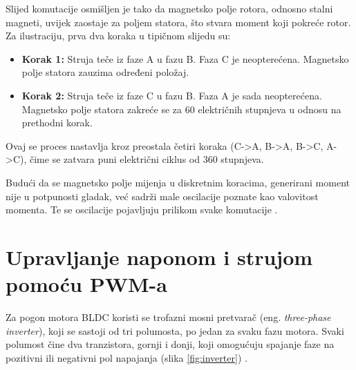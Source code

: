 \documentclass[diplomskirad]{fer}
\begin{document}
Slijed komutacije osmišljen je tako da magnetsko polje rotora, odnosno stalni
magneti, uvijek zaostaje za poljem statora, što stvara moment koji pokreće
rotor. Za ilustraciju, prva dva koraka u tipičnom slijedu su:

\begin{itemize}
	\item \textbf{Korak 1:} Struja teče iz faze A u fazu B. Faza C je neopterećena. Magnetsko polje statora zauzima određeni položaj.

	\item \textbf{Korak 2:} Struja teče iz faze C u fazu B. Faza A je sada neopterećena. Magnetsko polje statora zakreće se za 60 električnih stupnjeva u odnosu na prethodni korak.
\end{itemize}

Ovaj se proces nastavlja kroz preostala četiri koraka (C->A, B->A, B->C, A->C),
čime se zatvara puni električni ciklus od 360 stupnjeva. 

Budući da se magnetsko polje mijenja u diskretnim koracima, generirani moment
nije u potpunosti gladak, već sadrži male oscilacije poznate kao valovitost
momenta. Te se oscilacije pojavljuju prilikom svake komutacije \cite{TI2015}.
\label{trap:torque-ripple} 

\newpage
\section{Upravljanje naponom i strujom pomoću PWM-a}

Za pogon motora BLDC koristi se trofazni mosni pretvarač (eng.
\textit{three-phase inverter}), koji se sastoji od tri polumosta, po jedan za
svaku fazu motora. Svaki polumost čine dva tranzistora, gornji i donji, koji
omogućuju spajanje faze na pozitivni ili negativni pol napajanja (slika
\ref{fig:inverter}) \cite{TI2015,ST_AN1946,MicrochipAN885}.
\end{document}

